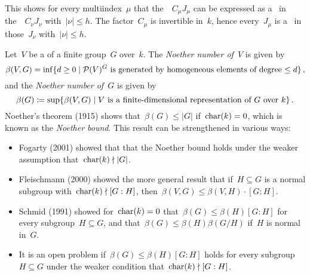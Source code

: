 This shows for every multiindex~$\mu$ that the~~$C_\mu J_\mu$ can be expressed as a~ in the~~$C_\nu J_\nu$ with~$|\nu| \leq h$.
The factor~$C_\mu$ is invertible in~$k$, hence every~$J_\mu$ is a~ in those~$J_\nu$ with~$|\nu| \leq h$.


\begin{remark}
  Let~$V$ be a {\fd} of a finite group~$G$ over~$k$.
  The \emph{Noether number of~$V$} is given by
  \[
    \beta(V,G)
      =
    \inf
    \{
      d \geq 0
    \suchthat
      \text{$\Pol(V)^G$ is generated by homogeneous elements of degree~$\leq d$}
    \} \,,
  \]
  and the \emph{Noether number of~$G$} is given by
  \[
    \beta(G)
      \defined
    \sup
    \{
      \beta(V,G)
    \suchthat
      \text{$V$ is a {\fd} representation of~$G$ over~$k$}
    \} \,.
  \]
  Noether’s theorem (1915) shows that~$\beta(G) \leq |G|$ if~$\operatorname{char}(k) = 0$, which is known as the \emph{Noether bound}.
  This result can be strengthened in various ways:
  \begin{itemize}
    \item
      Fogarty (2001) showed that that the Noether bound holds under the weaker assumption that~$\operatorname{char}(k) \nmid \lvert G\rvert$.
    \item
      Fleischmann (2000) showed the more general result that if~$H \subseteq G$ is a normal subgroup with~$\operatorname{char}(k) \nmid [G : H]$, then~$\beta(V,G) \leq \beta(V,H) \cdot [G : H]$.
    \item
      Schmid (1991) showed for~$\operatorname{char}(k) = 0$ that~$\beta(G) \leq \beta(H)[G : H]$ for every subgroup~$H \subseteq G$, and that~$\beta(G) \leq \beta(H)\beta(G/H)$ if~$H$ is normal in~$G$.
    \item
      It is an open problem if~$\beta(G) \leq \beta(H)[G : H]$ holds for every subgroup~$H \subseteq G$ under the weaker condition that~$\operatorname{char}(k) \nmid [G : H]$.
  \end{itemize}
\end{remark}




